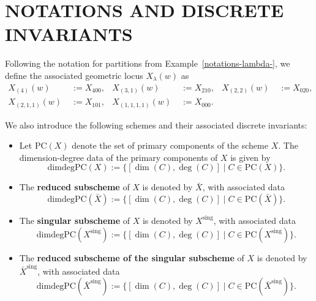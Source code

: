 \documentclass{amsart}
\begin{document}

\section{NOTATIONS AND DISCRETE INVARIANTS}

Following the notation for partitions from Example~\ref{notations-lambda-}, we define the associated geometric locus \(X_\lambda(w)\) as
\[
\begin{aligned}
X_{(4)}(w) &\; :=  X_{400}, & 
X_{(3,1)}(w) &\; := X_{210}, & 
X_{(2,2)}(w) &\; := X_{020}, \\
X_{(2,1,1)}(w) &\; := X_{101}, & 
X_{(1,1,1,1)}(w) &\; := X_{000}.
\end{aligned}
\]

We also introduce the following schemes and their associated discrete invariants:
\begin{itemize}
  \item Let $\mathrm{PC}(X)$ denote the set of primary components of the scheme $X$. 
  The dimension-degree data of the primary components of \( X \) is given by
  \[
  \mathrm{dimdegPC}(X) := \{ [\dim(C), \deg(C)] \mid C \in \mathrm{PC}(X) \}.
  \]

  \item The \textbf{reduced subscheme} of $X$ is denoted by $\bar{X}$, 
  with associated data
  \[
  \mathrm{dimdegPC}(\bar{X}) := \{ [\dim(C), \deg(C)] \mid C \in \mathrm{PC}(\bar{X}) \}. \] 
  
  \item The \textbf{singular subscheme} of $X$ is denoted by 
   $X^{\mathrm{sing}}$, 
  with associated data
  $$
  \mathrm{dimdegPC}(X^{\mathrm{sing}}) := \{ [\dim(C), \deg(C)] \mid C \in \mathrm{PC}(X^{\mathrm{sing}}) \}. 
  $$

  \item The \textbf{reduced subscheme of the singular subscheme} of $X$ is denoted by 
  $\bar{X}^{\mathrm{sing}}$, with associated data
  $$
  \mathrm{dimdegPC}(\bar{X}^{\mathrm{sing}}) := \{ [\dim(C), \deg(C)] \mid C \in \mathrm{PC}(\bar{X}^{\mathrm{sing}}) \}. 
   $$
\end{itemize}
\end{document}
